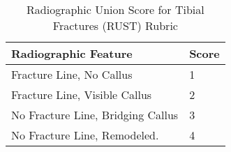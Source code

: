 \begin{table}[H]
    \centering
    \begin{tabular}{@{}ll@{}}
    \toprule
    Radiographic Feature              & Score \\ \midrule
    Fracture Line, No Callus          & 1     \\
    Fracture Line, Visible Callus     & 2     \\
    No Fracture Line, Bridging Callus & 3     \\
    No Fracture Line, Remodeled.      & 4     \\ \bottomrule
    \end{tabular}
    \caption{Radiographic Union Score for Tibial Fractures (RUST) Rubric}\label{tab:rust-score-components}
\end{table}